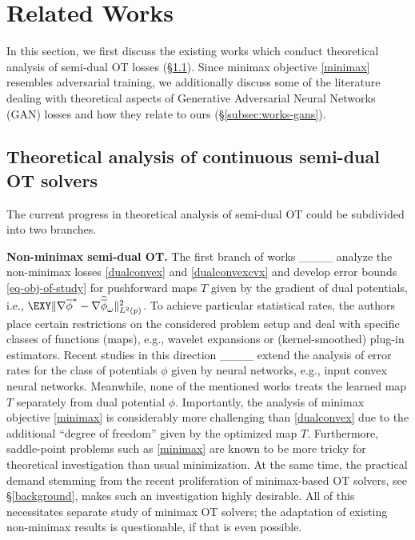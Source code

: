 \section{Related Works}
\label{sec:works}

In this section, we first discuss the existing works which conduct theoretical analysis of semi-dual OT losses (\S \ref{subsec:works-OT}). Since minimax objective \eqref{minimax} resembles adversarial training, we additionally discuss some of the literature dealing with theoretical aspects of Generative Adversarial Neural Networks (GAN) losses and how they relate to ours (\S \ref{subsec:works-gans}). 

\subsection{Theoretical analysis of continuous semi-dual OT solvers}\label{subsec:works-OT}

The current progress in theoretical analysis of semi-dual OT could be subdivided into two branches.

\textbf{Non-minimax semi-dual OT.} The first branch of works ____ analyze the non-minimax losses \eqref{dualconvex} and \eqref{dualconvexcvx} and develop error bounds \eqref{eq-obj-of-study} for pushforward maps $T$ given by the gradient of dual potentials, i.e., $\EXY \Vert \nabla \overline{\phi}^* - \nabla \widehat{\overline{\phi}}_{\omega} \Vert^2_{L^2(p)}$. To achieve particular statistical rates, the authors place certain restrictions on the considered problem setup and deal with specific classes of functions (maps), e.g., wavelet expansions or (kernel-smoothed) plug-in estimators. Recent studies in this direction ____ extend the analysis of error rates for the class of potentials $\phi$ given by neural networks, e.g., input convex neural networks. Meanwhile, none of the mentioned works treats the learned map $T$ separately from dual potential $\phi$. Importantly, the analysis of minimax objective \eqref{minimax} is considerably more challenging than \eqref{dualconvex} due to the additional ``degree of freedom'' given by the optimized map $T$. Furthermore, saddle-point problems such as \eqref{minimax} are known to be more tricky for theoretical investigation than usual minimization. At the same time, the practical demand stemming from the recent proliferation of minimax-based OT solvers, see \S \ref{background}, makes such an investigation highly desirable. All of this necessitates separate study of minimax OT solvers; the adaptation of existing non-minimax results is questionable, if that is even possible.


